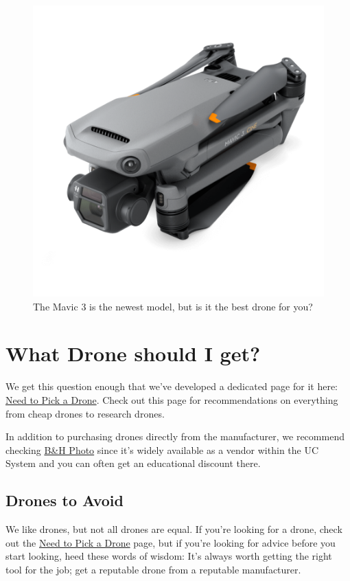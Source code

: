 \documentclass[
  12pt,
]{book}
\begin{document}
\begin{figure}

{\centering \includegraphics[width=0.75\linewidth]{images/mavic3} 

}

\caption{The Mavic 3 is the newest model, but is it the best drone for you?}\label{fig:drone3}
\end{figure}

\section{What Drone should I get?}\label{what-drone-should-i-get}

We get this question enough that we've developed a dedicated page for it here: \href{https://ucdrones.github.io/pickdrone.html}{Need to Pick a Drone}. Check out this page for recommendations on everything from cheap drones to research drones.

In addition to purchasing drones directly from the manufacturer, we recommend checking \href{https://www.bhphotovideo.com/}{B\&H Photo} since it's widely available as a vendor within the UC System and you can often get an educational discount there.

\subsection{Drones to Avoid}\label{drones-to-avoid}

We like drones, but not all drones are equal. If you're looking for a drone, check out the \href{https://ucdrones.github.io/pickdrone.html}{Need to Pick a Drone} page, but if you're looking for advice before you start looking, heed these words of wisdom: It's always worth getting the right tool for the job; get a reputable drone from a reputable manufacturer.
\end{document}
